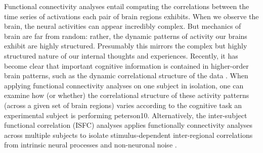 \documentclass[12pt]{article}
\begin{document}
Functional connectivity analyses entail computing the correlations between the time series of activations each pair of brain regions exhibits. When we observe the brain, the neural activities can appear incredibly complex. But mechanics of brain are far from random: rather, the dynamic patterns of activity our brains exhibit are highly structured. Presumably this mirrors the complex but highly structured nature of our internal thoughts and experiences. Recently, it has become clear that important cognitive information is contained in higher-order brain patterns, such as the dynamic correlational structure of the data \cite{davidson2016}. When applying functional connectivity analyses on one subject in isolation, one can examine how (or whether) the correlational structure of these activity patterns (across a given set of brain regions) varies according to the cognitive task an experimental subject is performing \cite{Turke13}\cite{Rubinov2010}{peterson10}. Alternatively, the inter-subject functional correlation (ISFC) analyses applies functionally connectivity analyses across multiple subjects to isolate stimulus-dependent inter-regional correlations from intrinsic neural processes and non-neuronal noise \cite{hasson2016}\cite{jeremy2017}.\\
\end{document}
